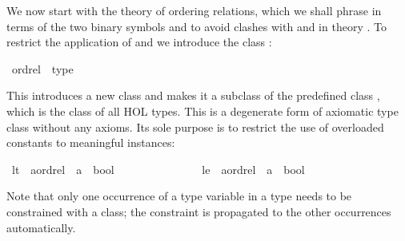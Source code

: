 %
\begin{isabellebody}%
\def\isabellecontext{Overloading{\isadigit{1}}}%
%
\isadelimtheory
%
\endisadelimtheory
%
\isatagtheory
%
\endisatagtheory
{\isafoldtheory}%
%
\isadelimtheory
%
\endisadelimtheory
%
\isamarkuptrue%
%
\begin{isamarkuptext}%
We now start with the theory of ordering relations, which we shall phrase
in terms of the two binary symbols \isa{{\isacharless}{\isacharless}} and \isa{{\isacharless}{\isacharless}{\isacharequal}}
to avoid clashes with \isa{{\isacharless}} and \isa{{\isacharless}{\isacharequal}} in theory . To restrict the application of \isa{{\isacharless}{\isacharless}} and \isa{{\isacharless}{\isacharless}{\isacharequal}} we
introduce the class :%
\end{isamarkuptext}%
\isamarkuptrue%
\isamarkupfalse%
\ ordrel\ {\isacharless}\ type%
\begin{isamarkuptext}%
\noindent
This introduces a new class  and makes it a subclass of
the predefined class , which
is the class of all HOL types.
This is a degenerate form of axiomatic type class without any axioms.
Its sole purpose is to restrict the use of overloaded constants to meaningful
instances:%
\end{isamarkuptext}%
\isamarkuptrue%
\isamarkupfalse%
\ lt\ {\isacharcolon}{\isacharcolon}\ {\isachardoublequoteopen}{\isacharparenleft}{\isacharprime}a{\isacharcolon}{\isacharcolon}ordrel{\isacharparenright}\ {\isasymRightarrow}\ {\isacharprime}a\ {\isasymRightarrow}\ bool{\isachardoublequoteclose}\ \ \ \ \ {\isacharparenleft}\ {\isachardoublequoteopen}{\isacharless}{\isacharless}{\isachardoublequoteclose}\ \ {}{}{\isacharparenright}\isanewline
\ \ \ \ \ \ \ le\ {\isacharcolon}{\isacharcolon}\ {\isachardoublequoteopen}{\isacharparenleft}{\isacharprime}a{\isacharcolon}{\isacharcolon}ordrel{\isacharparenright}\ {\isasymRightarrow}\ {\isacharprime}a\ {\isasymRightarrow}\ bool{\isachardoublequoteclose}\ \ \ \ \ {\isacharparenleft}\ {\isachardoublequoteopen}{\isacharless}{\isacharless}{\isacharequal}{\isachardoublequoteclose}\ {}{}{\isacharparenright}%
\begin{isamarkuptext}%
\noindent
Note that only one occurrence of a type variable in a type needs to be
constrained with a class; the constraint is propagated to the other
occurrences automatically.


\end{isamarkuptext}
\end{isabellebody}
